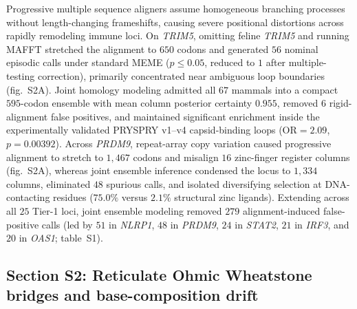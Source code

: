 \documentclass[12pt]{article}
\begin{document}
Progressive multiple sequence aligners assume homogeneous branching processes without length-changing frameshifts, causing severe positional distortions across rapidly remodeling immune loci. On \textit{TRIM5}, omitting feline \textit{TRIM5} and running MAFFT stretched the alignment to $650$ codons and generated $56$ nominal episodic calls under standard MEME ($p \le 0.05$, reduced to $1$ after multiple-testing correction), primarily concentrated near ambiguous loop boundaries (fig.~S2A). Joint homology modeling admitted all $67$ mammals into a compact $595$-codon ensemble with mean column posterior certainty $0.955$, removed $6$ rigid-alignment false positives, and maintained significant enrichment inside the experimentally validated PRYSPRY v1--v4 capsid-binding loops ($\mathrm{OR} = 2.09$, $p = 0.00392$). Across \textit{PRDM9}, repeat-array copy variation caused progressive alignment to stretch to $1,467$ codons and misalign $16$ zinc-finger register columns (fig.~S2A), whereas joint ensemble inference condensed the locus to $1,334$ columns, eliminated $48$ spurious calls, and isolated diversifying selection at DNA-contacting residues ($75.0\%$ versus $2.1\%$ structural zinc ligands). Extending across all $25$ Tier-1 loci, joint ensemble modeling removed $279$ alignment-induced false-positive calls (led by $51$ in \textit{NLRP1}, $48$ in \textit{PRDM9}, $24$ in \textit{STAT2}, $21$ in \textit{IRF3}, and $20$ in \textit{OAS1}; table~S1).

\subsection*{Section S2: Reticulate Ohmic Wheatstone bridges and base-composition drift}
\end{document}
